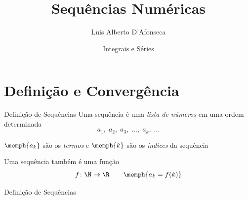 
\usepackage{apresentacao}
\usepackage{mathconfig}
\usepackage{tabto}

\setlength{\parskip}{0.5\baselineskip}

\setcounter{exemplo}{0}

\makeatletter
\graphicspath  {{./figs/}}
\makeatother

\title {Sequências Numéricas}
\author{\large Luis Alberto D'Afonseca}
\date  {Integrais e Séries}



\begin{frame}
    \titlepage
\end{frame}

\section{Definição e Convergência}

\begin{frame}{Definição de Sequências}
    Uma sequência é uma \emph{lista de números} em uma ordem determinada
    \[a_1,\;a_2,\;a_3,\; \dots,\; a_k,\; \dots\]

    \pause
    $\memph{a_k}$ são os \emph{termos}
    \pause
    \;e\; $\memph{k}$ são os \emph{índices} da sequência

    \pause
    \vspace{\baselineskip}
    Uma sequência também é uma função
    \[f\colon\N\to\R \qquad \memph{a_k = f(k)}\]
\end{frame}

\begin{frame}{Definição de Sequências}
\begin{columns}
  \centerline{\scalebox{0.9}{}}  \pause
  \centerline{\scalebox{0.9}{}}
\end{columns}
\end{frame}

